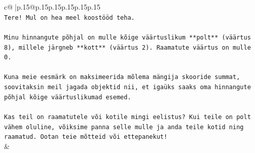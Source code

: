 \documentclass{article}
\begin{document}
{\begin{supertabular}{c@{$\;$}|p{.15\linewidth}@{}p{.15\linewidth}p{.15\linewidth}p{.15\linewidth}p{.15\linewidth}p{.15\linewidth}}
{{{\\ 
\texttt{Tere! Mul on hea meel koostööd teha.} \\
\\ 
\texttt{Minu hinnangute põhjal on mulle kõige väärtuslikum **polt** (väärtus 8), millele järgneb **kott** (väärtus 2). Raamatute väärtus on mulle 0.} \\
\\ 
\texttt{Kuna meie eesmärk on maksimeerida mõlema mängija skooride summat, soovitaksin meil jagada objektid nii, et igaüks saaks oma hinnangute põhjal kõige väärtuslikumad esemed.} \\
\\ 
\texttt{Kas teil on raamatutele või kotile mingi eelistus? Kui teile on polt vähem oluline, võiksime panna selle mulle ja anda teile kotid ning raamatud. Ootan teie mõtteid või ettepanekut!} \\
            }
        }
    }
    & \\ \\


\end{supertabular}}
\end{document}
